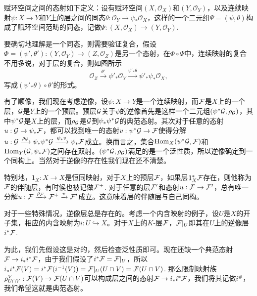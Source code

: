 赋环空间之间的态射如下定义：设有赋环空间$(X,\mathcal{O}_X)$和$(Y,\mathcal{O}_Y)$，以及连续映射$\psi:X\to Y$和$Y$上的层之间的同态$\theta:\mathcal{O}_Y\to \psi_*\mathcal{O}_X$，这样的一个二元组$\Psi=(\psi,\theta)$构成了赋环空间范畴的同态，记做$\Psi:(X,\mathcal{O}_X)\to (Y,\mathcal{O}_Y)$.

要确切地理解是一个同态，则需要验证复合，假设$\Phi=(\psi',\theta'):(Y,\mathcal{O}_Y)\to (Z,\mathcal{O}_Z)$是另一个态射，在$\Phi\circ \Psi$中，连续映射的复合不用多说，对于层的复合，则如图所示
\[
	\mathcal{O}_Z\xrightarrow{\theta'} \psi'_*\mathcal{O}_Y \xrightarrow{\psi'_*\theta} \psi'_*\psi_*\mathcal{O}_X,
\]
写成$(\psi'_*\theta)\circ \theta'$的形式。

\para 有了顺像，我们现在考虑逆像，设$\psi:X\to Y$是一个连续映射，而$\mathcal{F}$是$X$上的一个层，$\mathcal{G}$是$Y$上的一个预层。预层$\mathcal{G}$关于$\psi$的逆像首先是这样一个二元组$(\psi^*\mathcal{G},\rho_{\mathcal{G}})$，其中$\psi^*\mathcal{G}$是$X$上的层，而$\rho_{\mathcal{G}}$是$\mathcal{G}$到$\psi_*\psi^*\mathcal{G}$的典范态射。其次对于任意的态射$u:\mathcal{G} \to \psi_*\mathcal{F}$，都可以找到唯一的态射$v:\psi^*\mathcal{G} \to \mathcal{F}$使得分解$u:\mathcal{G}\xrightarrow{\rho_{\mathcal{G}}} \psi_*\psi^*\mathcal{G} \xrightarrow{\psi_*v} \psi_*\mathcal{F}$成立。换而言之，集合$\operatorname{Hom}_X(\psi^*\mathcal{G},\mathcal{F})$和$\operatorname{Hom}_Y(\mathcal{G},\psi_*\mathcal{F})$之间存在双射。$(\psi^*\mathcal{G},\rho_{\mathcal{G}})$满足的是一个泛性质，所以逆像确定到一个同构上。当然对于逆像的存在性我们现在还不清楚。

特别地，$1_X:X\to X$是恒同映射，对于$X$上的预层$\mathcal{F}$，如果层$1_X^*\mathcal{F}$存在，则他称为$\mathcal{F}$的伴随层，有时候也被记做$\mathcal{F}^+$. 对于任意的层$\mathcal{F}'$和态射$u:\mathcal{F}\to\mathcal{F}'$，总有唯一分解$u:\mathcal{F}\xrightarrow{\rho_{\mathcal{F}}} \mathcal{F}^+ \xrightarrow{v} \mathcal{F}'$成立。这意味着层的伴随层与自己同构。

\para 对于一些特殊情况，逆像层总是存在的。考虑一个内含映射的例子，设$U$是$X$的开子集，相应的内含映射为$i:U\hookrightarrow X$。对于$X$上的$K$-层$\mathcal{F}$，$\mathcal{F}|_U$即其在$U$上的逆像层$i^*\mathcal{F}$.

\proof 为此，我们先假设这是对的，然后检查泛性质即可。现在还缺一个典范态射$\mathcal{F}\to i_*i^*\mathcal{F}$，由于我们假设了$i^*\mathcal{F}=\mathcal{F}|_U$，所以$i_*i^*\mathcal{F}(V)=i^*\mathcal{F}(i^{-1}(V))=\mathcal{F}|_U(U\cap V)=\mathcal{F}(U\cap V)$. 那么限制映射族$\rho^V_{U\cap V}:\mathcal{F}(V)\to \mathcal{F}(U\cap V)$可以构成层之间的态射$\mathcal{F}\to i_*i^*\mathcal{F}$，我们将其记做$i^\#$，我们希望这就是典范态射。

